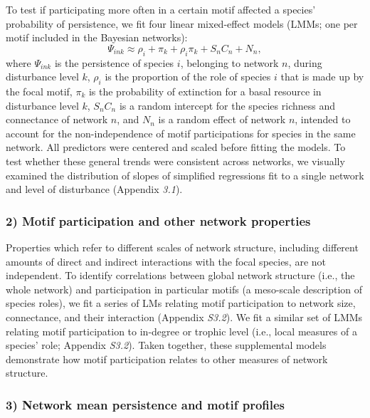 \documentclass[12pt]{article}
\begin{document}
\begin{spacing}{2.0}
            To test if participating more often in a certain motif affected a species' probability of persistence, we fit four linear mixed-effect models (LMMs; one per motif included in the Bayesian networks):
                \begin{equation}
                    \Psi_{ink} \approx \rho_{i} + \pi_{k} + \rho_{i}\pi_{k} +
                    S_{n}C_{n} + N_n,
                    \label{propreq}
                \end{equation}
            \noindent where $\Psi_{ink}$ is the persistence of species $i$, belonging to network $n$, during disturbance level $k$, $\rho_{i}$ is the proportion of the role of species $i$ that is made up by the focal motif, $\pi_k$ is the probability of extinction for a basal resource in disturbance level $k$,  $S_{n}C_{n}$ is a random intercept for the species richness and connectance of network $n$, and $N_n$ is a random effect of network $n$, intended to account for the non-independence of motif participations for species in the same network.
            All predictors were centered and scaled before fitting the models.         
            To test whether these general trends were consistent across networks, we visually examined the distribution of slopes of simplified regressions fit to a single network and level of disturbance (Appendix \emph{3.1}).
        
        \subsubsection*{2) Motif participation and other network properties}    
            
            Properties which refer to different scales of network structure, including different amounts of direct and indirect interactions with the focal species, are not independent. 
            To identify correlations between global network structure (i.e., the whole network) and participation in particular motifs (a meso-scale description of species roles), we fit a series of LMs relating motif participation to network size, connectance, and their interaction (Appendix \emph{S3.2}).
            We fit a similar set of  LMMs relating motif participation to in-degree or trophic level (i.e., local measures of a species' role; Appendix \emph{S3.2}).
            Taken together, these supplemental models demonstrate how motif participation relates to other measures of network structure.
            
            
        \subsubsection*{3) Network mean persistence and motif profiles}


\end{spacing}
\end{document}
